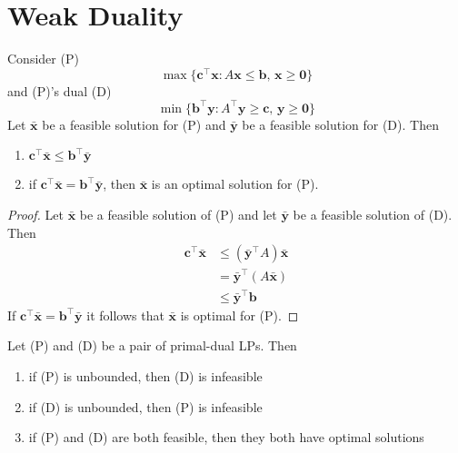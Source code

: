 \section{Weak Duality}
\begin{thmbox}
    \begin{theorem}
        Consider (P)
        \[ \max \{\bm{c}^{\top} \bm{x}: A \bm{x} \leqslant  \bm{b},\, \bm{x} \geqslant  \bm{0}\} \]
        and (P)'s dual (D)
        \[ \min \{\bm{b}^{\top} \bm{y}: A^{\top} \bm{y} \geqslant  \bm{c},\, \bm{y} \geqslant  \bm{0}\}\]
        Let $ \bm{\bar{x}} $ be a feasible solution for (P) and $ \bm{\bar{y}} $
        be a feasible solution for (D). Then
        \begin{enumerate}[label=(\arabic*)]
            \item $ \bm{c}^\top \bm{\bar{x}}\leqslant \bm{b}^\top \bm{\bar{y}} $
            \item if $ \bm{c}^\top \bm{\bar{x}}=\bm{b}^\top \bm{\bar{y}} $, then
                  $ \bm{\bar{x}} $ is an optimal solution for (P).
        \end{enumerate}
    \end{theorem}
\end{thmbox}

\begin{proof}
    Let $ \bm{\bar{x}} $ be a feasible solution of (P) and let $ \bm{\bar{y}} $
    be a feasible solution of (D). Then
    \begin{align*}
        \bm{c}^\top \bm{\bar{x}}
         & \leqslant (\bm{\bar{y}}^\top A)\bm{\bar{x}} \\
         & = \bm{\bar{y}}^\top (A\bm{\bar{x}})         \\
         & \leqslant \bm{\bar{y}}^\top \bm{b}
    \end{align*}
    If $ \bm{c}^\top \bm{\bar{x}}=\bm{b}^\top \bm{\bar{y}} $ it follows
    that $ \bm{\bar{x}} $ is optimal for (P).
\end{proof}

\begin{thmbox}
    \begin{theorem}
        Let (P) and (D) be a pair of primal-dual LPs. Then
        \begin{enumerate}[label=(\arabic*)]
            \item if (P) is unbounded, then (D) is infeasible
            \item if (D) is unbounded, then (P) is infeasible
            \item if (P) and (D) are both feasible, then they both
                  have optimal solutions
        \end{enumerate}
    \end{theorem}
\end{thmbox}

